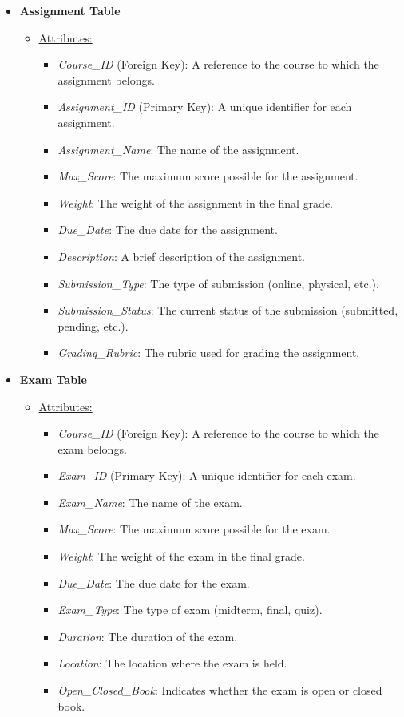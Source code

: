\documentclass[12pt]{article}
\begin{document}
\begin{itemize}
    \item \textbf{Assignment Table}
    \begin{itemize}
        \item \underline{Attributes:}
        \begin{itemize}
            \item \textit{Course\_ID} (Foreign Key): A reference to the course to which the assignment belongs.
            \item \textit{Assignment\_ID} (Primary Key): A unique identifier for each assignment.
            \item \textit{Assignment\_Name}: The name of the assignment.
            \item \textit{Max\_Score}: The maximum score possible for the assignment.
            \item \textit{Weight}: The weight of the assignment in the final grade.
            \item \textit{Due\_Date}: The due date for the assignment.
            \item \textit{Description}: A brief description of the assignment.
            \item \textit{Submission\_Type}: The type of submission (online, physical, etc.).
            \item \textit{Submission\_Status}: The current status of the submission (submitted, pending, etc.).
            \item \textit{Grading\_Rubric}: The rubric used for grading the assignment.
        \end{itemize}
    \end{itemize}
    
    \item \textbf{Exam Table}
    \begin{itemize}
        \item \underline{Attributes:}
        \begin{itemize}
            \item \textit{Course\_ID} (Foreign Key): A reference to the course to which the exam belongs.
            \item \textit{Exam\_ID} (Primary Key): A unique identifier for each exam.
            \item \textit{Exam\_Name}: The name of the exam.
            \item \textit{Max\_Score}: The maximum score possible for the exam.
            \item \textit{Weight}: The weight of the exam in the final grade.
            \item \textit{Due\_Date}: The due date for the exam.
            \item \textit{Exam\_Type}: The type of exam (midterm, final, quiz).
            \item \textit{Duration}: The duration of the exam.
            \item \textit{Location}: The location where the exam is held.
            \item \textit{Open\_Closed\_Book}: Indicates whether the exam is open or closed book.
        \end{itemize}
    \end{itemize}
    

\end{itemize}
\end{document}
